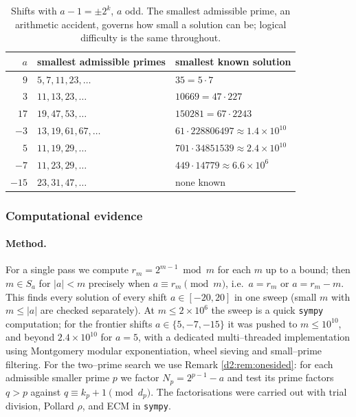 \documentclass[a4paper]{article}
\theoremstyle{plain}
\theoremstyle{definition}
\theoremstyle{remark}
\newcommand{\Sa}{S_a}
\begin{document}
\begin{table}[H]
\centering
\begin{tabular}{rl l}
\toprule
$a$ & smallest admissible primes & smallest known solution\\
\midrule
$9$ & $5,7,11,23,\dots$ & $35=5\cdot7$\\
$3$ & $11,13,23,\dots$ & $10669=47\cdot227$\\
$17$ & $19,47,53,\dots$ & $150281=67\cdot2243$\\
$-3$ & $13,19,61,67,\dots$ & $61\cdot228806497\approx1.4\times10^{10}$\\
$5$ & $11,19,29,\dots$ & $701\cdot34851539\approx2.4\times10^{10}$\\
$-7$ & $11,23,29,\dots$ & $449\cdot14779\approx6.6\times10^{6}$\\
$-15$ & $23,31,47,\dots$ & none known\\
\bottomrule
\end{tabular}
\caption{Shifts with $a-1=\pm2^{k}$, $a$ odd. The smallest admissible prime, an arithmetic accident, governs how small a solution can be; logical difficulty is the same throughout.}
\label{d2:tab:smallest}
\end{table}

\subsubsection{Computational evidence}\label{d2:sec:computation}

\paragraph{Method.} For a single pass we compute $r_m=2^{m-1}\bmod m$ for each $m$ up to a bound; then $m\in\Sa$ for $|a|<m$ precisely when $a\equiv r_m\pmod m$, i.e.\ $a=r_m$ or $a=r_m-m$. This finds every solution of every shift $a\in[-20,20]$ in one sweep (small $m$ with $m\le|a|$ are checked separately). At $m\le2\times10^{6}$ the sweep is a quick \texttt{sympy} computation; for the frontier shifts $a\in\{5,-7,-15\}$ it was pushed to $m\le10^{10}$, and beyond $2.4\times10^{10}$ for $a=5$, with a dedicated multi--threaded implementation using Montgomery modular exponentiation, wheel sieving and small--prime filtering. For the two--prime search we use Remark \ref{d2:rem:onesided}: for each admissible smaller prime $p$ we factor $N_p=2^{p-1}-a$ and test its prime factors $q>p$ against $q\equiv k_p+1\pmod{d_p}$. The factorisations were carried out with trial division, Pollard $\rho$, and ECM in \texttt{sympy}.
\end{document}
